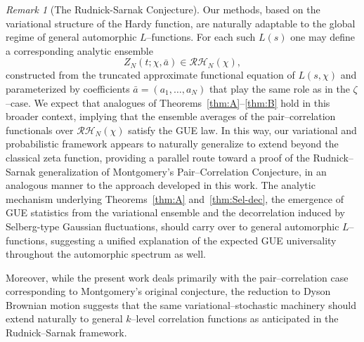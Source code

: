 \documentclass[12pt,reqno]{amsart}
\theoremstyle{plain}
\theoremstyle{definition}
\theoremstyle{remark}
\newtheorem{rem}{Remark}[section]       %
\begin{document}
\begin{rem}[The Rudnick-Sarnak Conjecture]
Our methods, based on the variational structure of the Hardy function,
are naturally adaptable to the global regime of general automorphic $L$--functions.
For each such $L(s)$ one may define a corresponding analytic ensemble
\begin{equation}
Z_N(t;\chi,\bar a)\in\mathcal{RH}_N(\chi),
\end{equation}
constructed from the truncated approximate functional equation of $L(s,\chi)$
and parameterized by coefficients $\bar a=(a_1,\dots,a_N)$
that play the same role as in the $\zeta$--case.
We expect that analogues of Theorems~\ref{thm:A}--\ref{thm:B}
hold in this broader context,
implying that the ensemble averages of the pair--correlation functionals
over $\mathcal{RH}_N(\chi)$ satisfy the GUE law.
In this way, our variational and probabilistic framework appears to naturally generalize
to extend beyond the classical zeta function,
providing a parallel route toward a proof of the
Rudnick--Sarnak generalization of Montgomery’s Pair--Correlation Conjecture,
in an analogous manner to the approach developed in this work.
The analytic mechanism underlying Theorems~\ref{thm:A} and~\ref{thm:Sel-dec},
the emergence of GUE statistics from the variational ensemble and
the decorrelation induced by Selberg-type Gaussian fluctuations, 
should carry over to general automorphic $L$--functions,
suggesting a unified explanation of the expected GUE universality
throughout the automorphic spectrum as well. 

Moreover, while the present work deals primarily with the pair–correlation case corresponding to Montgomery’s original conjecture, the reduction to Dyson Brownian motion suggests that the same variational–stochastic machinery should extend naturally to general $k$–level correlation functions as anticipated in the Rudnick–Sarnak framework.
\end{rem}
\end{document}
